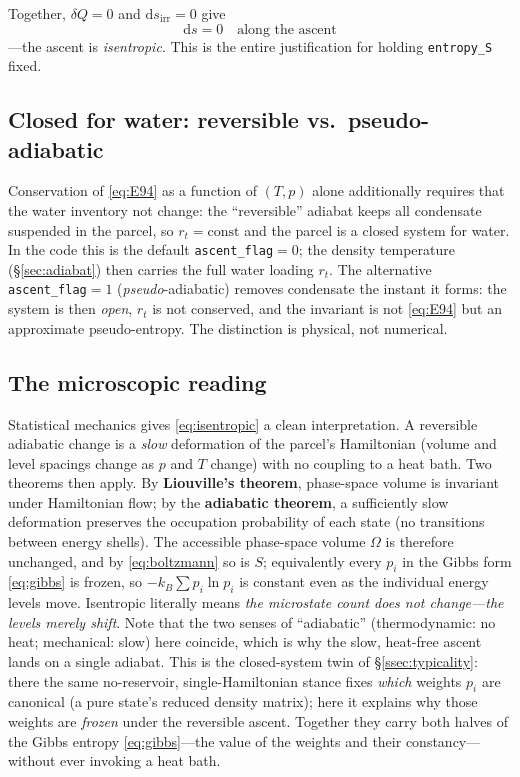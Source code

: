 \documentclass[11pt,a4paper]{article}
\theoremstyle{definition}
\newcommand{\rt}{r_t}
\newcommand{\dd}{\mathrm{d}}
\begin{document}
Together, $\delta Q=0$ and $\dd s_{\mathrm{irr}}=0$ give
\begin{equation}\label{eq:isentropic}
\boxed{\;\dd s = 0 \quad\text{along the ascent}\;}
\end{equation}
---the ascent is \emph{isentropic}. This is the entire justification for
holding \texttt{entropy\_S} fixed.

\subsection{Closed for water: reversible vs.\ pseudo-adiabatic}

Conservation of \eqref{eq:E94} as a function of $(T,p)$ alone additionally
requires that the water inventory not change: the ``reversible'' adiabat keeps
all condensate suspended in the parcel, so $\rt=\mathrm{const}$ and the parcel
is a closed system for water. In the code this is the default
\texttt{ascent\_flag}$=0$; the density temperature (\S\ref{sec:adiabat}) then
carries the full water loading $\rt$. The alternative
\texttt{ascent\_flag}$=1$ (\emph{pseudo}-adiabatic) removes condensate the
instant it forms: the system is then \emph{open}, $\rt$ is not conserved, and
the invariant is not \eqref{eq:E94} but an approximate pseudo-entropy. The
distinction is physical, not numerical.

\subsection{The microscopic reading}\label{ssec:micro}

Statistical mechanics gives \eqref{eq:isentropic} a clean interpretation. A
reversible adiabatic change is a \emph{slow} deformation of the parcel's
Hamiltonian (volume and level spacings change as $p$ and $T$ change) with no
coupling to a heat bath. Two theorems then apply. By \textbf{Liouville's
theorem}, phase-space volume is invariant under Hamiltonian flow; by the
\textbf{adiabatic theorem}, a sufficiently slow deformation preserves the
occupation probability of each state (no transitions between energy shells).
The accessible phase-space volume $\Omega$ is therefore unchanged, and by
\eqref{eq:boltzmann} so is $S$; equivalently every $p_i$ in the Gibbs form
\eqref{eq:gibbs} is frozen, so $-k_B\sum p_i\ln p_i$ is constant even as the
individual energy levels move. Isentropic literally means \emph{the
microstate count does not change---the levels merely shift}. Note that the two
senses of ``adiabatic'' (thermodynamic: no heat; mechanical: slow) here
coincide, which is why the slow, heat-free ascent lands on a single adiabat.
This is the closed-system twin of \S\ref{ssec:typicality}: there the same
no-reservoir, single-Hamiltonian stance fixes \emph{which} weights $p_i$ are
canonical (a pure state's reduced density matrix); here it explains why those
weights are \emph{frozen} under the reversible ascent. Together they carry both
halves of the Gibbs entropy \eqref{eq:gibbs}---the value of the weights and
their constancy---without ever invoking a heat bath.
\end{document}
